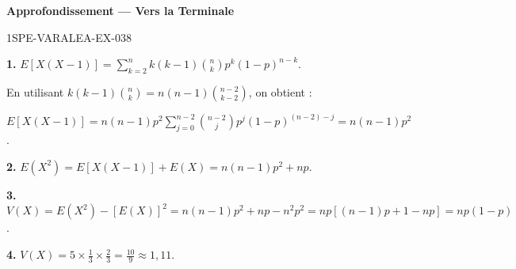 \begin{center}\textbf{Approfondissement — Vers la Terminale}\end{center}
\begin{corrige}{1SPE-VARALEA-EX-038}

\textbf{1.} $E[X(X-1)] = \sum_{k=2}^{n} k(k-1)\binom{n}{k}p^k(1-p)^{n-k}$.

En utilisant $k(k-1)\binom{n}{k} = n(n-1)\binom{n-2}{k-2}$, on obtient :

$E[X(X-1)] = n(n-1)p^2 \sum_{j=0}^{n-2}\binom{n-2}{j}p^j(1-p)^{(n-2)-j} = n(n-1)p^2$.

\medskip
\textbf{2.} $E(X^2) = E[X(X-1)] + E(X) = n(n-1)p^2 + np$.

\medskip
\textbf{3.} $V(X) = E(X^2) - [E(X)]^2 = n(n-1)p^2 + np - n^2p^2 = np[(n-1)p + 1 - np] = np(1-p)$.

\medskip
\textbf{4.} $V(X) = 5 \times \frac{1}{3} \times \frac{2}{3} = \frac{10}{9} \approx 1{,}11$. \checkmark

\end{corrige}
